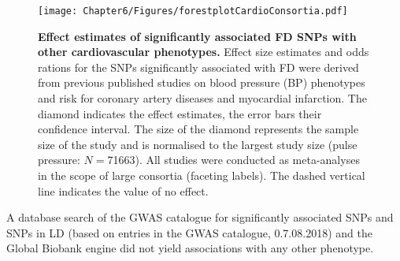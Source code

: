 \begin{figure}[hbtp]
	\centering
	\texttt{[image: Chapter6/Figures/forestplotCardioConsortia.pdf]}
	\caption[\textbf{Effect estimates of significantly associated FD SNPs with other cardiovascular phenotypes. }]{\textbf{Effect estimates of significantly associated FD SNPs with other cardiovascular phenotypes. }Effect size estimates and odds rations for the SNPs significantly associated with FD were derived from previous published studies on blood pressure (BP) phenotypes and risk for coronary artery diseases and myocardial infarction. The diamond indicates the effect estimates, the error bars their confidence interval. The size of the diamond represents the sample size of the study and is normalised to the largest study size (pulse pressure: \(N=\)\num{71663}). All studies were conducted as meta-analyses in the scope of large consortia (faceting labels). The dashed vertical line indicates the value of no effect. }
	 	\label{fig:consortia}
\end{figure}
%
A database search of the GWAS catalogue \citep{MacArthur2017} for significantly associated SNPs and SNPs in LD  (based on entries in the GWAS catalogue, 0.7.08.2018) and the Global Biobank engine \citep{GBE2017} did not yield associations with any other phenotype. 
